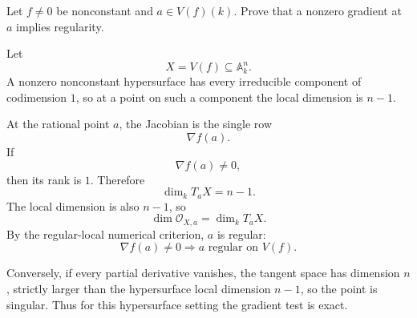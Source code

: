 \begin{problem}\label{prob:vi32-13}
Let \(f\ne0\) be nonconstant and \(a\in V(f)(k)\). Prove that a nonzero gradient at \(a\) implies regularity.

\end{problem}

\ifdefined\FullProblemDossiers
\begin{solution}
Let
\[
X=V(f)\subseteq\mathbb A^n_k.
\]
A nonzero nonconstant hypersurface has every irreducible component of codimension \(1\), so at a point on such a
component the local dimension is \(n-1\).

At the rational point \(a\), the Jacobian is the single row
\[
\nabla f(a).
\]
If
\[
\nabla f(a)\ne0,
\]
then its rank is \(1\). Therefore
\[
\dim_kT_aX=n-1.
\]
The local dimension is also \(n-1\), so
\[
\dim\mathcal O_{X,a}
=
\dim_kT_aX.
\]
By the regular-local numerical criterion, \(a\) is regular:
\[
\boxed{\nabla f(a)\ne0\Longrightarrow a\text{ regular on }V(f)}.
\]

Conversely, if every partial derivative vanishes, the tangent space has dimension \(n\), strictly larger than the
hypersurface local dimension \(n-1\), so the point is singular. Thus for this hypersurface setting the gradient test
is exact.
\end{solution}
\fi
